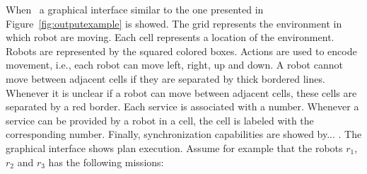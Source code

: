 When  \toolName\ a graphical interface similar to the one presented  in Figure~\ref{fig:outputexample} is showed.
The grid represents the environment in which robot are moving.
Each cell represents a location of the environment. 
Robots are represented by the squared colored boxes.
Actions are used to encode movement, i.e., each robot can move left, right, up and down.
A robot  cannot move between adjacent cells if they are separated by thick bordered lines.
Whenever  it is unclear if a robot can move between adjacent cells, these cells are separated by a red border.
Each service is associated with a number.
Whenever a service can be provided by a robot in a cell, the cell is labeled with the corresponding number.
Finally, synchronization capabilities are showed by... .
The graphical interface shows plan execution.
Assume for example that the robots $r_1$, $r_2$ and $r_3$ has the following missions: 






